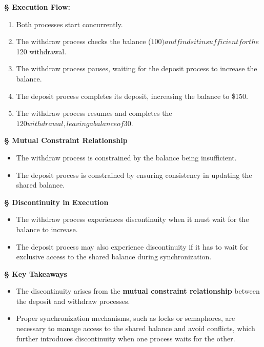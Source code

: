 \documentclass[a4paper]{book}
\newcommand{\sfbf}[1]{{\normalsize\textsf{\textbf{§ #1}}}}
\begin{document}
\sfbf{Execution Flow:}

\begin{enumerate}
\item 
Both processes start concurrently.

\item 
The withdraw process checks the balance ($100) and finds it insufficient for the $120 withdrawal.

\item 
The withdraw process pauses, waiting for the deposit process to increase the balance.

\item 
The deposit process completes its deposit, increasing the balance to \$150.

\item 
The withdraw process resumes and completes the $120 withdrawal, leaving a balance of $30.

\end{enumerate}

\sfbf{Mutual Constraint Relationship}

\begin{itemize}
\item 
The withdraw process is constrained by the balance being insufficient.

\item 
The deposit process is constrained by ensuring consistency in updating the shared balance.

\end{itemize}

\sfbf{Discontinuity in Execution}

\begin{itemize}
\item 
The withdraw process experiences discontinuity when it must wait for the balance to increase.

\item 
The deposit process may also experience discontinuity if it has to wait for exclusive access to the shared balance during synchronization.

\end{itemize}

\sfbf{Key Takeaways}


\begin{itemize}
\item 
The discontinuity arises from the \textbf{mutual constraint relationship} between the deposit and withdraw processes.

\item 
Proper synchronization mechanisms, such as locks or semaphores, are necessary to manage access to the shared balance and avoid conflicts, which further introduces discontinuity when one process waits for the other.

\end{itemize}
\end{document}
